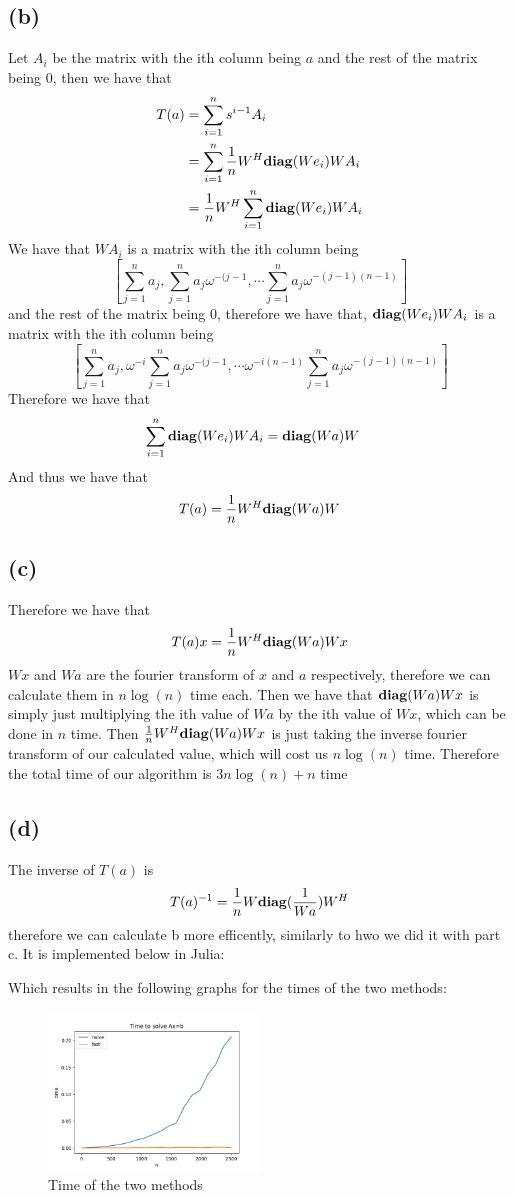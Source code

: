 \subsection*{(b)}
Let $A_i$ be the matrix with the ith column
being $a$ and the rest of the matrix being 0, then we have that 
\begin{align*}
T(a)&=\sum_{i=1}^n s^{i-1}A_i\\
&=\sum_{i=1}^n\frac{1}{n}W^H\text{\textbf{diag}}(We_i)WA_i\\
&=\frac{1}{n}W^H\sum_{i=1}^n \text{\textbf{diag}}(We_i)WA_i\\
\end{align*}
We have that $WA_i$ is a matrix
with the ith column being $$\left[\sum_{j=1}^n a_j, \sum_{j=1}^n a_j\omega^{-(j-1}, \cdots \sum_{j=1}^n a_j\omega^{-(j-1)(n-1)}\right]$$
and the rest of the matrix being 0, therefore we have that, $\text{\textbf{diag}}(We_i)WA_i$
is a matrix with the ith column being $$\left[\sum_{j=1}^n a_j, \omega^{-i}\sum_{j=1}^n a_j\omega^{-(j-1}, 
\cdots \omega^{-i(n-1)}\sum_{j=1}^n a_j\omega^{-(j-1)(n-1)}\right]$$ Therefore we have
that 
\begin{align*}
    \sum_{i=1}^n \text{\textbf{diag}}(We_i)WA_i&=\text{\textbf{diag}}(Wa)W
\end{align*}
And thus we have that
$$T(a)=\frac{1}{n}W^H\text{\textbf{diag}}(Wa)W$$
\subsection*{(c)}
Therefore we have that 
$$T(a)x=\frac{1}{n}W^H\text{\textbf{diag}}(Wa)Wx$$
$Wx$ and $Wa$ are the fourier transform of $x$ and $a$ respectively, therefore we can calculate
them in $n\log(n)$ time each. Then we have that $\text{\textbf{diag}}(Wa)Wx$ is simply just multiplying
the ith value of $Wa$ by the ith value of $Wx$, which can be done in $n$ time. Then $\frac{1}{n}W^H\text{\textbf{diag}}(Wa)Wx$
is just taking the inverse fourier transform of our calculated value, which will cost us $n\log(n)$ time. Therefore
the total time of our algorithm is $\boxed{3n\log(n)+n}$ time
\subsection*{(d)}
The inverse of $T(a)$ is  $$T(a)^{-1}=\frac{1}{n}W\text{\textbf{diag}}(\frac{1}{Wa})W^H$$ therefore 
we can calculate b more efficently, similarly to hwo we did it with part c. It is implemented below in Julia:

Which results in the following graphs for the times of the two methods:
\begin{figure}[h]
    \centering
    \includegraphics[width=0.5\textwidth]{69d.png}
    \caption{Time of the two methods}
    \label{fig:69d}
\end{figure}
